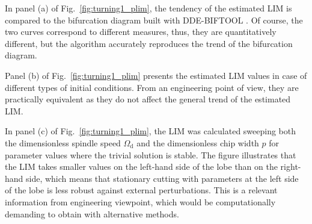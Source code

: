 \documentclass[preprint,12pt]{elsarticle}
\begin{document}
	In panel (a) of Fig.~\ref{fig:turning1_plim}, the tendency of the estimated LIM is compared to the bifurcation diagram built with DDE-BIFTOOL \cite{engelborghs2002numerical}. Of course, the two curves correspond to different measures, thus, they are quantitatively different, but the algorithm accurately reproduces the trend of the bifurcation diagram. 
	
	Panel (b) of Fig.~\ref{fig:turning1_plim} presents the estimated LIM values in case of different types of initial conditions. From an engineering point of view, they are practically equivalent as they do not affect the general trend of the estimated LIM.
	
	In panel (c) of Fig.~\ref{fig:turning1_plim}, the LIM was calculated sweeping both the dimensionless spindle speed $\Omega_\mathrm{d}$ and the dimensionless chip width $p$ for parameter values where the trivial solution is stable. The figure illustrates that the LIM takes smaller values on the left-hand side of the lobe than on the right-hand side, which means that stationary cutting with parameters at the left side of the lobe is less robust against external perturbations. This is a relevant information from engineering viewpoint, which would be computationally demanding to obtain with alternative methods. 
	
	
\end{document}
